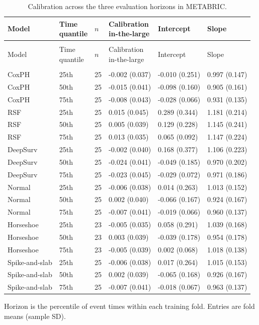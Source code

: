 \begin{longtable}{@{}>{\raggedright\arraybackslash}p{3.1cm}>{\raggedright\arraybackslash}p{1.3cm}p{0.5cm}p{2.9cm}p{2.9cm}p{2.9cm}@{}}
\caption{Calibration across the three evaluation horizons in METABRIC.}\label{tab:calibration-all-metabric}\\
\toprule Model & \shortstack[l]{Time\\quantile} & $n$ & \shortstack[l]{Calibration\\in-the-large} & Intercept & Slope \\\midrule\endfirsthead
\multicolumn{6}{l}{\tablename\ \thetable\ (continued)}\\
\toprule Model & \shortstack[l]{Time\\quantile} & $n$ & \shortstack[l]{Calibration\\in-the-large} & Intercept & Slope \\\midrule\endhead
\midrule\multicolumn{6}{r}{Continued on next page}\\\endfoot
\bottomrule\endlastfoot
CoxPH & 25th & 25 & -0.002 (0.037) & -0.010 (0.251) & 0.997 (0.147) \\
CoxPH & 50th & 25 & -0.015 (0.041) & -0.098 (0.160) & 0.905 (0.161) \\
CoxPH & 75th & 25 & -0.008 (0.043) & -0.028 (0.066) & 0.931 (0.135) \\
RSF & 25th & 25 & 0.015 (0.045) & 0.289 (0.344) & 1.181 (0.214) \\
RSF & 50th & 25 & 0.005 (0.039) & 0.129 (0.228) & 1.145 (0.241) \\
RSF & 75th & 25 & 0.013 (0.035) & 0.065 (0.092) & 1.147 (0.224) \\
DeepSurv & 25th & 25 & -0.002 (0.040) & 0.168 (0.377) & 1.106 (0.223) \\
DeepSurv & 50th & 25 & -0.024 (0.041) & -0.049 (0.185) & 0.970 (0.202) \\
DeepSurv & 75th & 25 & -0.023 (0.045) & -0.029 (0.072) & 0.971 (0.186) \\
Normal & 25th & 25 & -0.006 (0.038) & 0.014 (0.263) & 1.013 (0.152) \\
Normal & 50th & 25 & 0.002 (0.040) & -0.066 (0.167) & 0.924 (0.167) \\
Normal & 75th & 25 & -0.007 (0.041) & -0.019 (0.066) & 0.960 (0.137) \\
Horseshoe & 25th & 23 & -0.005 (0.035) & 0.058 (0.291) & 1.039 (0.168) \\
Horseshoe & 50th & 23 & 0.003 (0.039) & -0.039 (0.178) & 0.954 (0.178) \\
Horseshoe & 75th & 23 & -0.005 (0.039) & 0.002 (0.068) & 1.018 (0.138) \\
Spike-and-slab & 25th & 25 & -0.006 (0.038) & 0.017 (0.264) & 1.015 (0.153) \\
Spike-and-slab & 50th & 25 & 0.002 (0.039) & -0.065 (0.168) & 0.926 (0.167) \\
Spike-and-slab & 75th & 25 & -0.007 (0.041) & -0.018 (0.067) & 0.963 (0.137) \\
\end{longtable}
\noindent Horizon is the percentile of event times within each training fold. Entries are fold means (sample SD).\par\endgroup
